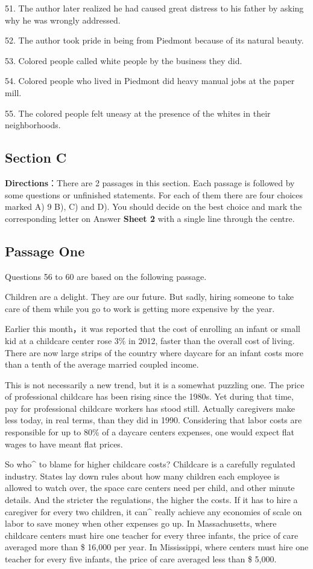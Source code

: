 \documentclass[UTF8,11pt]{ctexart}
\begin{document}
51. The author later realized he had caused great distress to his father by asking why he was wrongly addressed.


52. The author took pride in being from Piedmont because of its natural beauty.


53. Colored people called white people by the business they did.


54. Colored people who lived in Piedmont did heavy manual jobs at the paper mill.


55. The colored people felt uneasy at the presence of the whites in their neighborhoods.


\subsection*{\textbf{Section C}}


\textbf{Directions}：There are 2 passages in this section. Each passage is followed by some questions or unfinished statements. For each of them there are four choices marked A) 9 B), C) and D). You should decide on the best choice and mark the corresponding letter on Answer\textbf{ Sheet 2} with a single line through the centre.


\subsection*{Passage One}


Questions 56 to 60 are based on the following passage.


Children are a delight. They are our future. But sadly, hiring someone to take care of them while you go to work is getting more expensive by the year.


Earlier this month，it was reported that the cost of enrolling an infant or small kid at a childcare center rose 3\% in 2012, faster than the overall cost of living. There are now large strips of the country where daycare for an infant costs more than a tenth of the average married coupled income.


This is not necessarily a new trend, but it is a somewhat puzzling one. The price of professional childcare has been rising since the 1980s. Yet during that time, pay for professional childcare workers has stood still. Actually caregivers make less today, in real terms, than they did in 1990. Considering that labor costs are responsible for up to 80\% of a daycare centers expenses, one would expect flat wages to have meant flat prices.


So who\textasciicircum{} to blame for higher childcare costs? Childcare is a carefully regulated industry. States lay down rules about how many children each employee is allowed to watch over, the space care centers need per child, and other minute details. And the stricter the regulations, the higher the costs. If it has to hire a caregiver for every two children, it can\textasciicircum{} really achieve any economies of scale on labor to save money when other expenses go up. In Massachusetts, where childcare centers must hire one teacher for every three infants, the price of care averaged more than \$ 16,000 per year. In Mississippi, where centers must hire one teacher for every five infants, the price of care averaged less than \$ 5,000.
\end{document}
